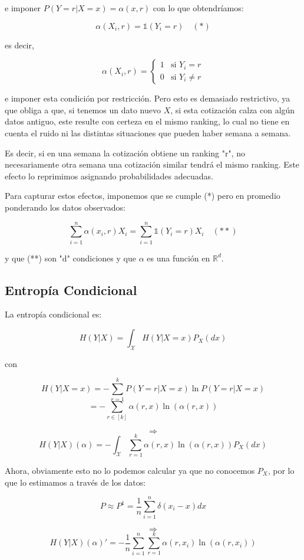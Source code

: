 e imponer \( P(Y=r|X=x) = \alpha(x,r) \) con lo que obtendríamos:

\[ \alpha(X_i,r) = \mathbb{1}(Y_i=r) \quad (*) \]

es decir,

\[ \alpha(X_i,r) = 
\begin{cases} 
1 & \text{si } Y_i = r \\ 
0 & \text{si } Y_i \neq r 
\end{cases} \]

e imponer esta condición por restricción. Pero esto es demasiado restrictivo, ya que obliga a que, si tenemos un dato nuevo \( X \), si esta cotización calza con algún datos antiguo, este resulte con certeza en el mismo ranking, lo cual no tiene en cuenta el ruido ni las 
distintas situaciones que pueden haber semana a semana.

Es decir, si en una semana la cotización obtiene un ranking "r", no necesariamente otra semana una cotización similar tendrá el mismo ranking. Este efecto lo reprimimos asignando probabilidades adecuadas.

Para capturar estos efectos, imponemos que se cumple (*) pero en promedio ponderando los datos observados:

\[ \sum_{i=1}^{n} \alpha(x_i,r) X_i = \sum_{i=1}^{n} \mathbb{1}(Y_i = r) X_i \quad (**) \]

y que (**) son "d" condiciones y que \( \alpha \) es una función en \( \mathbb{R}^d \).

\subsection{Entropía Condicional}

La entropía condicional es:

\[ H(Y|X) = \int_{\mathcal{X}} H(Y|X=x) P_X(dx) \]

con

\[ H(Y|X=x) = -\sum_{r=1}^{k} P(Y=r|X=x) \ln P(Y=r|X=x) \]
\[ = -\sum_{r \in [k]} \alpha(r,x) \ln (\alpha(r,x)) \]

\[ \Rightarrow \]
\[ H(Y|X)(\alpha) = -\int_{\mathcal{X}} \sum_{r=1}^{k} \alpha(r,x) \ln(\alpha(r,x)) P_X(dx) \]

Ahora, obviamente esto no lo podemos calcular ya que no conocemos \( P_X \), por lo que lo estimamos a través de los datos:

\[ P \approx P^1 = \frac{1}{n} \sum_{i=1}^{n} \delta(x_i - x)dx \]

\[ \Rightarrow \]
\[ H(Y|X)(\alpha)' = -\frac{1}{n} \sum_{i=1}^{n} \sum_{r=1}^{k} \alpha(r,x_i) \ln(\alpha(r,x_i)) \]

